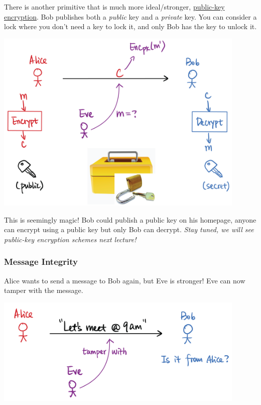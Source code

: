 \begin{definition}
    There is another primitive that is much more ideal/stronger, \ul{public-key encryption}. Bob publishes both a \emph{public} key and a \emph{private} key. You can consider a lock where you don't need a key to lock it, and only Bob has the key to unlock it.

    \begin{center}
        \includegraphics[width=0.9\textwidth]{images/2023-01-26/public_key.png}
    \end{center}

    This is seemingly magic! Bob could publish a public key on his homepage, anyone can encrypt using a public key but only Bob can decrypt. \emph{Stay tuned, we will see public-key encryption schemes next lecture!}
\end{definition}

\subsubsection{Message Integrity}
Alice wants to send a message to Bob again, but Eve is stronger! Eve can now tamper with the message.

\begin{center}
    \includegraphics[width=0.9\textwidth]{images/2023-01-26/integrity.png}
\end{center}


